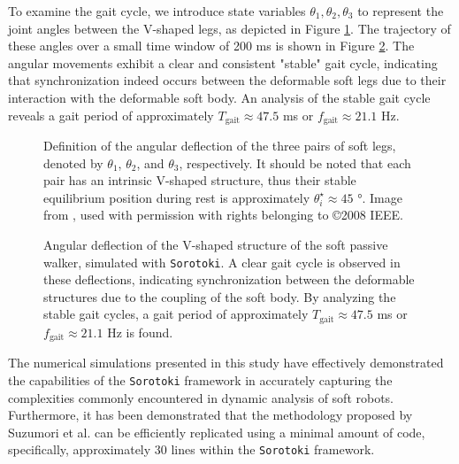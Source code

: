 To examine the gait cycle, we introduce state variables $\theta_1, \theta_2, \theta_3$ to represent the joint angles between the V-shaped legs, as depicted in Figure \ref{fig:C5:passivewalker_states}. The trajectory of these angles over a small time window of 200 \si{\milli \second} is shown in Figure \ref{fig:C5:passivewalker_gait}. The angular movements exhibit a clear and consistent "stable" gait cycle, indicating that synchronization indeed occurs between the deformable soft legs due to their interaction with the deformable soft body. An analysis of the stable gait cycle reveals a gait period of approximately $T_{\textrm{gait}} \approx 47.5$ \si{\milli \second} or $f_{\textrm{gait}} \approx 21.1$ \si{\hertz}.
%
\begin{figure}[!t]
    \centering
    \def\svgwidth{0.65\textwidth}
    
    \caption{\small Definition of the angular deflection of the three pairs of soft legs, denoted by $\theta_1$, $\theta_2$, and $\theta_3$, respectively. It should be noted that each pair has an intrinsic V-shaped structure, thus their stable equilibrium position during rest is approximately $\theta_i^\star \approx 45$ \si{\degree}. Image from \cite{Suzumori2008Sep}, used with permission with rights belonging to \copyright2008 IEEE.}
    \label{fig:C5:passivewalker_states}
    \vspace{-2mm}
    \end{figure}
    \begin{figure}[!t]
        
        
        \caption{\small Angular deflection of the V-shaped structure of the soft passive walker, simulated with \texttt{Sorotoki}. A clear gait cycle is observed in these deflections, indicating synchronization between the deformable structures due to the coupling of the soft body. By analyzing the stable gait cycles, a gait period of approximately $T_{\textrm{gait}} \approx 47.5$ \si{\milli \second} or $f_{\textrm{gait}} \approx 21.1$ \si{\hertz} is found.}
        \label{fig:C5:passivewalker_gait}
        \vspace{-6mm}
    \end{figure}
%
The numerical simulations presented in this study have effectively demonstrated the capabilities of the  \texttt{Sorotoki} framework in accurately capturing the complexities commonly encountered in dynamic analysis of soft robots. Furthermore, it has been demonstrated that the methodology proposed by Suzumori et al. \cite{Suzumori2008Sep} can be efficiently replicated using a minimal amount of code, specifically, approximately 30 lines within the \texttt{Sorotoki} framework.


